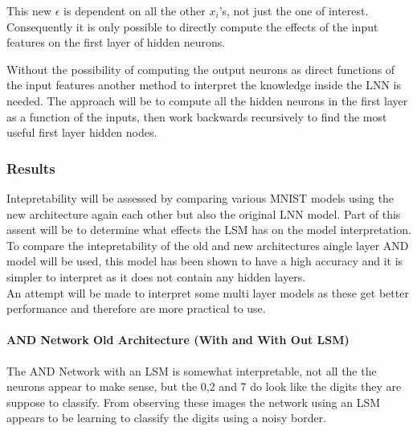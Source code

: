 This new $\epsilon$ is dependent on all the other $x_i$'s, not just the one of interest. Consequently it is only possible to directly compute the effects of the input features on the first layer of hidden neurons.\\


Without the possibility of computing the output neurons as direct functions of the input features another method to interpret the knowledge inside the LNN is needed. The approach will be to compute all the hidden neurons in the first layer as a function of the inputs, then work backwards recursively to find the most useful first layer hidden nodes.

\subsubsection{Results}


Intepretability will be assessed by comparing various MNIST models using the new architecture again each other but also the original LNN model. Part of this assent will be to determine what effects the LSM has on the model interpretation.\\

To compare the intepretability of the old and new architectures aingle layer AND model will be used, this model has been shown to have a high accuracy and it is simpler to interpret as it does not contain any hidden layers.\\

An attempt will be made to interpret some multi layer models as these get better performance and therefore are more practical to use.

\paragraph{AND Network Old Architecture (With and With Out LSM)}

The AND Network with an LSM is somewhat interpretable, not all the the neurons appear to make sense, but the 0,2 and 7 do look like the digits they are suppose to classify. From observing these images the network using an LSM appears to be learning to classify the digits using a noisy border.\\


